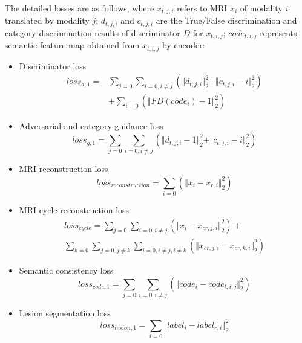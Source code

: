 \documentclass{ecai}
\begin{document}
The detailed losses are as follows, where $x_{t,j,i}$ refers to MRI $x_i$ of modality $i$ translated by modality $j$; $d_{t, j, i}$ and $c_{t, j, i}$ are the True/False discrimination and category discrimination results of discriminator $D$ for $x_{t, i, j}$; $code_{t,i,j}$ represents semantic feature map obtained from $x_{t,i,j}$ by encoder:
\begin{itemize}
	\item{Discriminator loss}
	\begin{equation}
	\begin{split}
	loss_{d,1}=&\sum\limits_{j=0}\sum\limits_{i=0, i\neq j}(\Vert{d_{t,j,i}}\Vert_{2}^{2}+\Vert{c_{t,j,i}-i}\Vert_{2}^{2})\\
	&+\sum\limits_{i=0}(\Vert{FD(code_{i})-1}\Vert_{2}^{2})
	\end{split}
	\end{equation}
	
	\item{Adversarial and category guidance loss}
	\begin{equation}
	loss_{g,1}=\sum\limits_{j=0}\sum\limits_{i=0, i\neq j}(\Vert{d_{t,j,i}-1}\Vert_{2}^{2}+\Vert{c_{t,j,i}-i}\Vert_{2}^{2})
	\end{equation}
	
	\item{MRI reconstruction loss}
	\begin{equation}
	loss_{reconstruction}=\sum\limits_{i=0}(\Vert{x_i-x_{r,i}}\Vert_{2}^{2})
	\end{equation}
	
	\item{MRI cycle-reconstruction loss}
	\begin{equation}
	\begin{split}
	loss_{cycle}=\sum\limits_{j=0}\sum\limits_{i=0, i\neq j}(\Vert{x_i-x_{cr,j,i}}\Vert_{2}^{2})+\\
	\sum\limits_{k=0}\sum\limits_{j=0,j\neq k}\sum\limits_{i=0, i\neq j,i\neq k}(\Vert{x_{cr,j,i}-x_{cr,k,i}}\Vert_{2}^{2})
	\end{split}
	\end{equation}
	
	\item{Semantic consistency loss}
	\begin{equation}
	loss_{code,1}=\sum\limits_{j=0}\sum\limits_{i=0, i\neq j}(\Vert{code_i-code_{t,i,j}}\Vert_{2}^{2})
	\end{equation}
	
	\item{Lesion segmentation loss}
	\begin{equation}
	loss_{lesion,1}=\sum\limits_{i=0}\Vert{label_i-label_{r,i}}\Vert_{2}^{2}
	\end{equation}
\end{itemize}
\fi
\end{document}
